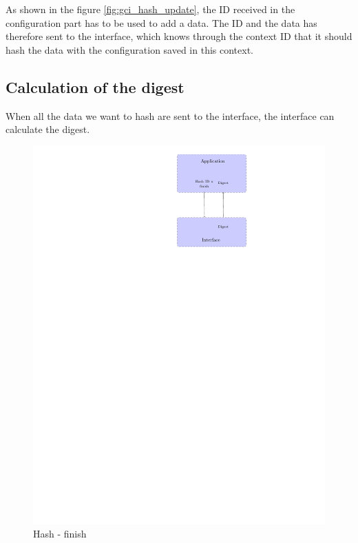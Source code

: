 As shown in the figure \ref{fig:gci_hash_update}, the ID received in the
configuration part has to be used to add a data.
The ID and the data has therefore sent to the interface, which knows through the
context ID that it should hash the data with the configuration saved in this
context.

\subsection*{Calculation of the digest}

When all the data we want to hash are sent to the interface, the interface can
calculate the digest.

\begin{figure}[!ht]
\centering
\includegraphics[trim=18.5cm 20cm 9.5cm 0cm]{figures/hash_example_finish.pdf}
\caption{Hash - finish\newline}
\label{fig:gci_hash_finish}
\end{figure}


